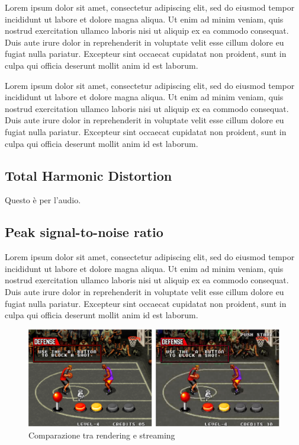 Lorem ipsum dolor sit amet, consectetur adipiscing elit, sed do eiusmod tempor incididunt ut labore et dolore magna aliqua. Ut enim ad minim veniam, quis nostrud exercitation ullamco laboris nisi ut aliquip ex ea commodo consequat. Duis aute irure dolor in reprehenderit in voluptate velit esse cillum dolore eu fugiat nulla pariatur. Excepteur sint occaecat cupidatat non proident, sunt in culpa qui officia deserunt mollit anim id est laborum.

Lorem ipsum dolor sit amet, consectetur adipiscing elit, sed do eiusmod tempor incididunt ut labore et dolore magna aliqua. Ut enim ad minim veniam, quis nostrud exercitation ullamco laboris nisi ut aliquip ex ea commodo consequat. Duis aute irure dolor in reprehenderit in voluptate velit esse cillum dolore eu fugiat nulla pariatur. Excepteur sint occaecat cupidatat non proident, sunt in culpa qui officia deserunt mollit anim id est laborum.

\subsection{Total Harmonic Distortion}
Questo è per l'audio.

\subsection{Peak signal-to-noise ratio}
Lorem ipsum dolor sit amet, consectetur adipiscing elit, sed do eiusmod tempor incididunt ut labore et dolore magna aliqua. Ut enim ad minim veniam, quis nostrud exercitation ullamco laboris nisi ut aliquip ex ea commodo consequat. Duis aute irure dolor in reprehenderit in voluptate velit esse cillum dolore eu fugiat nulla pariatur. Excepteur sint occaecat cupidatat non proident, sunt in culpa qui officia deserunt mollit anim id est laborum.

\begin{figure}[H]
	\includegraphics[width=\linewidth]{immagini/basket_compare}
	\caption{Comparazione tra rendering e streaming}
	\label{fig:basket_compare}
\end{figure}

